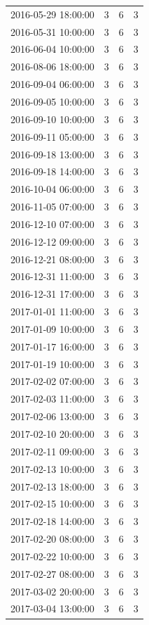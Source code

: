 \begin{tabular}{lrrr}
2016-05-29 18:00:00 & 3 & 6 & 3 \\
2016-05-31 10:00:00 & 3 & 6 & 3 \\
2016-06-04 10:00:00 & 3 & 6 & 3 \\
2016-08-06 18:00:00 & 3 & 6 & 3 \\
2016-09-04 06:00:00 & 3 & 6 & 3 \\
2016-09-05 10:00:00 & 3 & 6 & 3 \\
2016-09-10 10:00:00 & 3 & 6 & 3 \\
2016-09-11 05:00:00 & 3 & 6 & 3 \\
2016-09-18 13:00:00 & 3 & 6 & 3 \\
2016-09-18 14:00:00 & 3 & 6 & 3 \\
2016-10-04 06:00:00 & 3 & 6 & 3 \\
2016-11-05 07:00:00 & 3 & 6 & 3 \\
2016-12-10 07:00:00 & 3 & 6 & 3 \\
2016-12-12 09:00:00 & 3 & 6 & 3 \\
2016-12-21 08:00:00 & 3 & 6 & 3 \\
2016-12-31 11:00:00 & 3 & 6 & 3 \\
2016-12-31 17:00:00 & 3 & 6 & 3 \\
2017-01-01 11:00:00 & 3 & 6 & 3 \\
2017-01-09 10:00:00 & 3 & 6 & 3 \\
2017-01-17 16:00:00 & 3 & 6 & 3 \\
2017-01-19 10:00:00 & 3 & 6 & 3 \\
2017-02-02 07:00:00 & 3 & 6 & 3 \\
2017-02-03 11:00:00 & 3 & 6 & 3 \\
2017-02-06 13:00:00 & 3 & 6 & 3 \\
2017-02-10 20:00:00 & 3 & 6 & 3 \\
2017-02-11 09:00:00 & 3 & 6 & 3 \\
2017-02-13 10:00:00 & 3 & 6 & 3 \\
2017-02-13 18:00:00 & 3 & 6 & 3 \\
2017-02-15 10:00:00 & 3 & 6 & 3 \\
2017-02-18 14:00:00 & 3 & 6 & 3 \\
2017-02-20 08:00:00 & 3 & 6 & 3 \\
2017-02-22 10:00:00 & 3 & 6 & 3 \\
2017-02-27 08:00:00 & 3 & 6 & 3 \\
2017-03-02 20:00:00 & 3 & 6 & 3 \\
2017-03-04 13:00:00 & 3 & 6 & 3 \\

\end{tabular}
